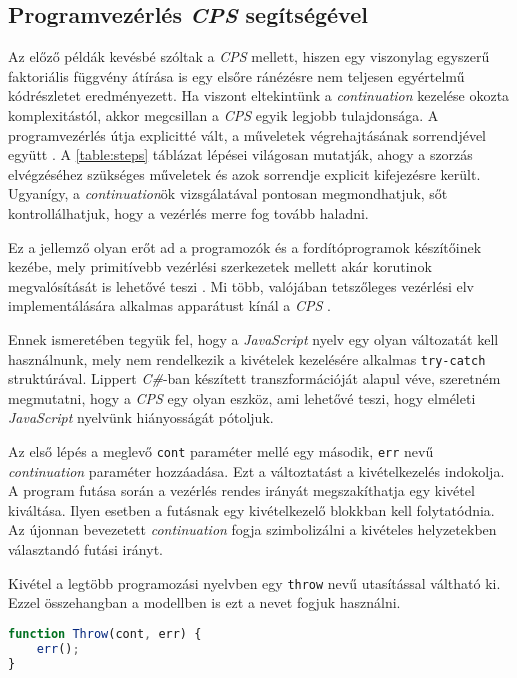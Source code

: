 \subsection{Programvezérlés \textit{CPS} segítségével}

Az előző példák kevésbé szóltak a \textit{CPS} mellett, hiszen egy viszonylag egyszerű faktoriális függvény átírása is egy elsőre ránézésre nem teljesen egyértelmű kódrészletet eredményezett. Ha viszont eltekintünk a \textit{continuation} kezelése okozta komplexitástól, akkor megcsillan a \textit{CPS} egyik legjobb tulajdonsága. A programvezérlés útja explicitté vált, a műveletek végrehajtásának sorrendjével együtt . A \ref{table:steps} táblázat lépései világosan mutatják, ahogy a szorzás elvégzéséhez szükséges műveletek és azok sorrendje explicit kifejezésre került. Ugyanígy, a \textit{continuation}ök vizsgálatával pontosan megmondhatjuk, sőt kontrollálhatjuk, hogy a vezérlés merre fog tovább haladni.

Ez a jellemző olyan erőt ad a programozók és a fordítóprogramok készítőinek kezébe, mely primitívebb vezérlési szerkezetek mellett akár korutinok megvalósítását is lehetővé teszi . Mi több, valójában tetszőleges vezérlési elv implementálására alkalmas apparátust kínál a \textit{CPS} \cite{Lippert2010}. 

Ennek ismeretében tegyük fel, hogy a \textit{JavaScript} nyelv egy olyan változatát kell használnunk, mely nem rendelkezik a kivételek kezelésére alkalmas \texttt{try-catch} struktúrával. Lippert \citeyear{Lippert2010} \textit{C\#}-ban készített transzformációját alapul véve, szeretném megmutatni, hogy a \textit{CPS} egy olyan eszköz, ami lehetővé teszi, hogy elméleti \textit{JavaScript} nyelvünk hiányosságát pótoljuk.

Az első lépés a meglevő \texttt{cont} paraméter mellé egy második, \texttt{err} nevű \textit{continuation} paraméter hozzáadása. Ezt a változtatást a kivételkezelés indokolja. A program futása során a vezérlés rendes irányát megszakíthatja egy kivétel kiváltása. Ilyen esetben a futásnak egy kivételkezelő blokkban kell folytatódnia. Az újonnan bevezetett \textit{continuation} fogja szimbolizálni a kivételes helyzetekben választandó futási irányt.

Kivétel a legtöbb programozási nyelvben egy \texttt{throw} nevű utasítással váltható ki. Ezzel összehangban a modellben is ezt a nevet fogjuk használni.

\begin{lstlisting}[language=JavaScript, caption={A \textit{throw} utasítás \textit{CPS}-ben}, captionpos=b, label=JSThrow]
function Throw(cont, err) {
    err();  
}
\end{lstlisting}


